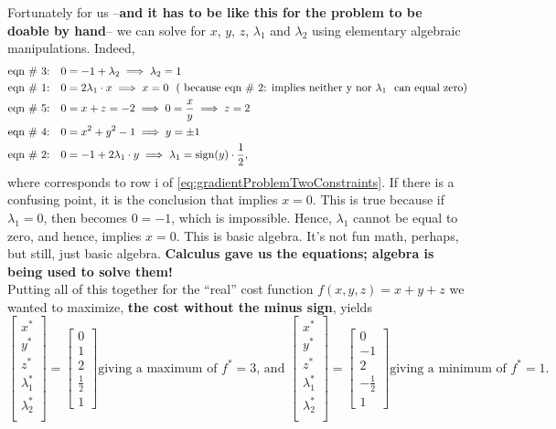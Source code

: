 Fortunately for us --\textbf{and it has to be like this for the problem to be doable by hand}-- we can solve for $x$, $y$, $z$, $\lambda_1$ and $\lambda_2$ using elementary algebraic manipulations. Indeed, 
\begin{align*}
\text{eqn \# 3:} ~~~&   0 = -1 +  \lambda_2  \implies \lambda_2 = 1\\
\text{eqn \# 1:} ~~~&      0 =2 \lambda_1 \cdot x  \implies x=0 ~~( \text{ because {eqn \# 2:} implies neither y nor}~\lambda_1 ~\text{ can equal zero})\\
 \text{eqn \# 5:} ~~~&     0 = x + z =- 2 \implies 0 = \frac{x}{y} \implies z = 2\\
 \text{eqn \# 4:} ~~~&      0 = x^2 + y^2 - 1  \implies y= \pm 1\\
 \text{eqn \# 2:} ~~~&      0 = -1 + 2 \lambda_1 \cdot y \implies \lambda_1= {\rm sign}(y) \cdot \frac{1}{2},\\
\end{align*}
where  corresponds to row i of \eqref{eq:gradientProblemTwoConstraints}. If there is a confusing point, it is the conclusion that  implies $x=0$. This is true because if $\lambda_1 = 0$, then  becomes $0 = -1$, which is impossible. Hence, $\lambda_1$
cannot be equal to zero, and hence,  implies $x=0$. This is basic algebra. It's not fun math, perhaps, but still, just basic algebra. \textbf{Calculus gave us the equations; algebra is being used to solve them!}\\

Putting all of this together for the ``real'' cost function $f(x, y, z) = x + y + z$ we wanted to maximize, \textbf{the cost without the minus sign}, yields
$$\left[\begin{array}{c}
x^\ast\\
y ^\ast\\
z ^\ast\\
\lambda_1^\ast \\
\lambda_2^\ast \\
\end{array} \right] = \left[\begin{array}{c}
0 \\ 1 \\ 2 \\ \frac{1}{2} \\ 1
\end{array} \right] \text{giving a maximum of $f^\ast = 3$, and } \left[\begin{array}{c}
x^\ast\\
y ^\ast\\
z ^\ast\\
\lambda_1^\ast \\
\lambda_2^\ast \\
\end{array} \right] = \left[\begin{array}{r}
0 \\ -1 \\ 2 \\ -\frac{1}{2} \\ 1
\end{array} \right] \text{giving a minimum of $f^\ast = 1$}.$$

